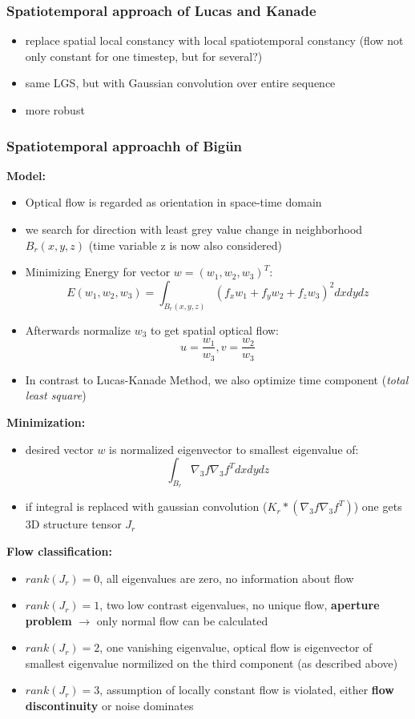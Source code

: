 \documentclass[11pt]{article}
\begin{document}
\subsubsection{Spatiotemporal approach of Lucas and Kanade}
\label{sec-3-1-3}
\begin{itemize}
\item replace spatial local constancy with local spatiotemporal constancy
(flow not only constant for one timestep, but for several?)
\item same LGS, but with Gaussian convolution over entire sequence
\item more robust
\end{itemize}

\subsubsection{Spatiotemporal approachh of Bigün}
\label{sec-3-1-4}
\textbf{Model:}
\begin{itemize}
\item Optical flow is regarded as orientation in space-time domain
\item we search for direction with least grey value change in neighborhood
      $B_r(x,y,z)$ (time variable z is now also considered)
\item Minimizing Energy for vector $w=(w_1,w_2,w_3)^T$:
      \[ E(w_1,w_2,w_3)= \int_{B_r(x,y,z)}(f_x w_1 + f_y w_2 + f_z w_3)^2 dx dy dz \]
\item Afterwards normalize $w_3$ to get spatial optical flow:
      \[ u=\frac{w_1}{w_3}, v=\frac{w_2}{w_3} \]
\item In contrast to Lucas-Kanade Method, we also optimize time component (\emph{total least square})
\end{itemize}
\textbf{Minimization:}
\begin{itemize}
\item desired vector $w$ is normalized eigenvector to smallest eigenvalue of:
      \[ \int_{B_r} \nabla_3 f \nabla_3 f^T dx dy dz \]
\item if integral is replaced with gaussian convolution ($K_r *(\nabla_3 f \nabla_3 f^T)$)
one gets 3D structure tensor $J_r$
\end{itemize}
\textbf{Flow classification:}
\begin{itemize}
\item $rank(J_r) = 0$, all eigenvalues are zero, no information about flow
\item $rank(J_r) = 1$, two low contrast eigenvalues, no unique flow, \textbf{aperture problem}
      $\rightarrow$ only normal flow can be calculated
\item $rank(J_r) = 2$, one vanishing eigenvalue, optical flow is eigenvector of smallest eigenvalue
normilized on the third component (as described above)
\item $rank(J_r) = 3$, assumption of locally constant flow is violated, either
      \textbf{flow discontinuity} or noise dominates
\end{itemize}
\end{document}
